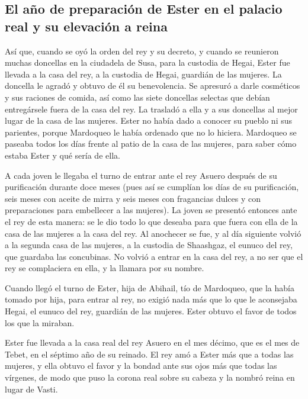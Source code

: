 \begin{paracol}{2}
\hypertarget{el-auxf1o-de-preparaciuxf3n-de-ester-en-el-palacio-real-y-su-elevaciuxf3n-a-reina}{%
\subsection{El año de preparación de Ester en el palacio real y su
elevación a
reina}\label{el-auxf1o-de-preparaciuxf3n-de-ester-en-el-palacio-real-y-su-elevaciuxf3n-a-reina}}

 Así que, cuando se oyó la orden del rey y su decreto, y
cuando se reunieron muchas doncellas en la ciudadela de Susa, para la
custodia de Hegai, Ester fue llevada a la casa del rey, a la custodia de
Hegai, guardián de las mujeres.  La doncella le agradó y
obtuvo de él su benevolencia. Se apresuró a darle cosméticos y sus
raciones de comida, así como las siete doncellas selectas que debían
entregársele fuera de la casa del rey. La trasladó a ella y a sus
doncellas al mejor lugar de la casa de las mujeres. 
Ester no había dado a conocer su pueblo ni sus parientes, porque
Mardoqueo le había ordenado que no lo hiciera.  Mardoqueo
se paseaba todos los días frente al patio de la casa de las mujeres,
para saber cómo estaba Ester y qué sería de ella.

 A cada joven le llegaba el turno de entrar ante el rey
Asuero después de su purificación durante doce meses (pues así se
cumplían los días de su purificación, seis meses con aceite de mirra y
seis meses con fragancias dulces y con preparaciones para embellecer a
las mujeres).  La joven se presentó entonces ante el rey
de esta manera: se le dio todo lo que deseaba para que fuera con ella de
la casa de las mujeres a la casa del rey.  Al anochecer
se fue, y al día siguiente volvió a la segunda casa de las mujeres, a la
custodia de Shaashgaz, el eunuco del rey, que guardaba las concubinas.
No volvió a entrar en la casa del rey, a no ser que el rey se
complaciera en ella, y la llamara por su nombre.

 Cuando llegó el turno de Ester, hija de Abihail, tío de
Mardoqueo, que la había tomado por hija, para entrar al rey, no exigió
nada más que lo que le aconsejaba Hegai, el eunuco del rey, guardián de
las mujeres. Ester obtuvo el favor de todos los que la miraban.

 Ester fue llevada a la casa real del rey Asuero en el
mes décimo, que es el mes de Tebet, en el séptimo año de su reinado.
 El rey amó a Ester más que a todas las mujeres, y ella
obtuvo el favor y la bondad ante sus ojos más que todas las vírgenes, de
modo que puso la corona real sobre su cabeza y la nombró reina en lugar
de Vasti.


\end{paracol}
